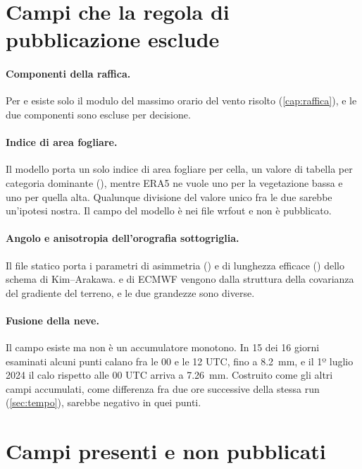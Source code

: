 \section{Campi che la regola di pubblicazione esclude}
\label{sec:esclusi}

\paragraph{Componenti della raffica.} Per  e  esiste solo il modulo del
massimo orario del vento risolto (\cref{cap:raffica}), e le due componenti sono escluse per
decisione.

\paragraph{Indice di area fogliare.} Il modello porta un solo indice di area fogliare per cella, un
valore di tabella per categoria dominante (), mentre ERA5 ne vuole uno per la
vegetazione bassa e uno per quella alta. Qualunque divisione del valore unico fra le due sarebbe
un'ipotesi nostra. Il campo  del modello è nei file wrfout e non è pubblicato.

\paragraph{Angolo e anisotropia dell'orografia sottogriglia.} Il file statico porta i parametri di
asimmetria () e di lunghezza efficace () dello schema di Kim--Arakawa.
 e  di ECMWF vengono dalla struttura della covarianza del gradiente del
terreno, e le due grandezze sono diverse.

\paragraph{Fusione della neve.} Il campo  esiste ma non è un accumulatore monotono. In
15 dei 16 giorni esaminati alcuni punti calano fra le 00 e le 12 UTC, fino a \SI{8.2}{mm}, e il 1º
luglio 2024 il calo rispetto alle 00 UTC arriva a \SI{7.26}{mm}. Costruito come gli altri
campi accumulati, come differenza fra due ore successive della stessa run (\cref{sec:tempo}),
 sarebbe negativo in quei punti.

\section{Campi presenti e non pubblicati}
\label{sec:non-pubblicati}

